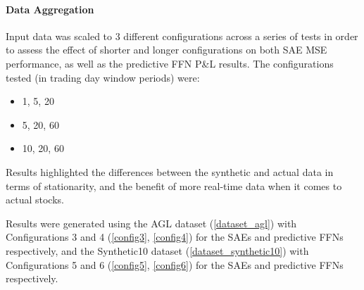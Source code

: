 \documentclass[a4paper,11pt,oneside]{article}
\theoremstyle{plain}
\theoremstyle{definition}
\begin{document}



\paragraph{Data Aggregation}

Input data was scaled to 3 different configurations across a series of tests in order to assess the effect of shorter and longer configurations on both SAE MSE performance, as well as the predictive FFN P\&L results. The configurations tested (in trading day window periods) were:

\begin{itemize}
	\item 1, 5, 20
	\item 5, 20, 60
	\item 10, 20, 60
\end{itemize}

Results highlighted the differences between the synthetic and actual data in terms of stationarity, and the benefit of more real-time data when it comes to actual stocks. \newline

Results were generated using the AGL dataset (\ref{dataset_agl}) with Configurations 3 and 4 (\ref{config3}, \ref{config4}) for the SAEs and predictive FFNs respectively, and the Synthetic10 dataset (\ref{dataset_synthetic10}) with Configurations 5 and 6 (\ref{config5}, \ref{config6}) for the  SAEs and predictive FFNs respectively.

\end{document}

